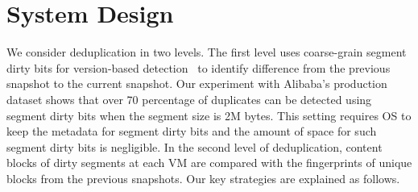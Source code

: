 \section{System Design}
\label{sect:arch}





We consider deduplication in two levels. The first level
uses coarse-grain segment  dirty bits for version-based detection~\cite{Clements2009,Vrable2009} to 
identify difference from the previous snapshot to the current snapshot.  
Our experiment with Alibaba's production dataset shows that over 70 percentage of 
duplicates can be detected using segment dirty bits when the segment size is 2M bytes.  
This setting requires OS to keep the metadata for segment dirty bits and the amount of space for such segment 
dirty bits is negligible. In the second level of deduplication, content blocks of dirty segments at each VM 
are compared with the fingerprints of unique  blocks from the previous snapshots.
Our key strategies are explained as follows.
